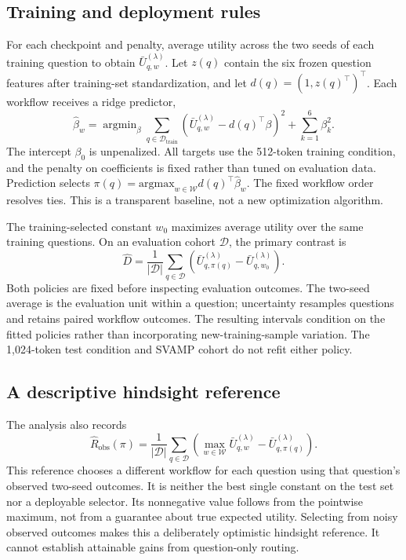 \documentclass[10pt]{article}
\begin{document}
\subsection{Training and deployment rules}
For each checkpoint and penalty, average utility across the two seeds of each
training question to obtain $\bar U_{q,w}^{(\lambda)}$. Let $z(q)$ contain the
six frozen question features after training-set standardization, and let
$d(q)=(1,z(q)^\top)^\top$. Each workflow receives a ridge predictor,
\begin{equation}
 \widehat\beta_w=\mathop{\mathrm{argmin}}_{\beta}
 \sum_{q\in\mathcal D_{\mathrm{train}}}
 (\bar U_{q,w}^{(\lambda)}-d(q)^\top\beta)^2
 +\sum_{k=1}^{6}\beta_k^2.
 \label{eq:ridge-router}
\end{equation}
The intercept $\beta_0$ is unpenalized. All targets use the 512-token training
condition, and the penalty on coefficients is fixed rather than tuned on
evaluation data. Prediction selects
$\pi(q)=\mathrm{argmax}_{w\in\mathcal W}d(q)^\top\widehat\beta_w$.
The fixed workflow order resolves ties. This is a transparent baseline, not
a new optimization algorithm.

The training-selected constant $w_0$ maximizes average utility over the same
training questions. On an evaluation cohort $\mathcal D$, the primary contrast
is
\begin{equation}
 \widehat D=\frac{1}{|\mathcal D|}\sum_{q\in\mathcal D}
 \left(\bar U_{q,\pi(q)}^{(\lambda)}-
       \bar U_{q,w_0}^{(\lambda)}\right).
 \label{eq:router-contrast}
\end{equation}
Both policies are fixed before inspecting evaluation outcomes. The two-seed
average is the evaluation unit within a question; uncertainty resamples
questions and retains paired workflow outcomes. The resulting intervals
condition on the fitted policies rather than incorporating new-training-sample
variation. The 1,024-token test condition and SVAMP cohort do not refit either
policy.

\subsection{A descriptive hindsight reference}
The analysis also records
\begin{equation}
 \widehat R_{\mathrm{obs}}(\pi)=
 \frac{1}{|\mathcal D|}\sum_{q\in\mathcal D}
 \left(\max_{w\in\mathcal W}\bar U_{q,w}^{(\lambda)}
       -\bar U_{q,\pi(q)}^{(\lambda)}\right).
 \label{eq:observed-oracle}
\end{equation}
This reference chooses a different workflow for each question using that
question's observed two-seed outcomes. It is neither the best single constant
on the test set nor a deployable selector. Its nonnegative value follows from
the pointwise maximum, not from a guarantee about true expected utility.
Selecting from noisy observed outcomes makes this a deliberately optimistic
hindsight reference. It cannot establish attainable gains from question-only
routing.
\end{document}
